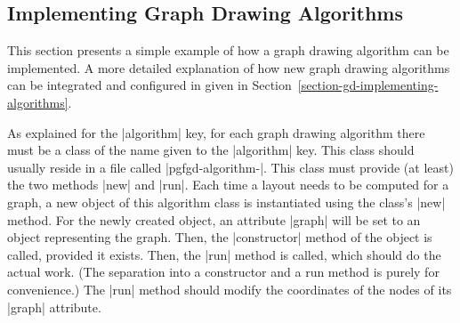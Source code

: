 %
%


\subsection{Implementing Graph Drawing Algorithms}

\label{section-gd-own-algorithm}
\label{section-library-graphdrawing-ownAlgorithm}

This section presents a simple example of how a graph drawing
algorithm can be implemented. A more detailed explanation of how
new graph drawing algorithms can be integrated and configured in given
in Section~\ref{section-gd-implementing-algorithms}.

As explained for the |algorithm| key, for each graph drawing algorithm
there must be a class of the name given to the |algorithm| key. This
class should usually reside in a file called
|pgfgd-algorithm-|. This class must provide (at
least) the two methods |new| and |run|. Each time a layout needs to
be computed for a graph, a new object of this algorithm class is
instantiated using the class's |new| method. For the newly created
object, an attribute |graph| will be set to an object representing the
graph. Then, the |constructor| method of the object is called,
provided it exists. Then, the |run| method is called, which should do
the actual work. (The separation into a constructor and a run method
is purely for convenience.) The |run| method should modify the
coordinates of the nodes of its |graph| attribute.

